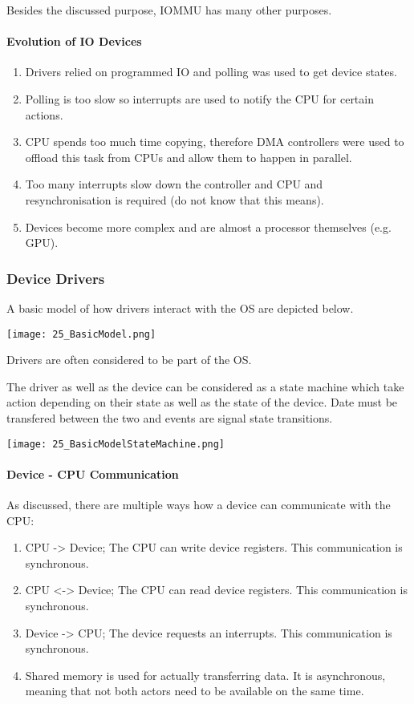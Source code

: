 Besides the discussed purpose, IOMMU has many other purposes.

\paragraph{Evolution of IO Devices}
\begin{enumerate}
    \item Drivers relied on programmed IO and polling was used to get device states.
    \item Polling is too slow so interrupts are used to notify the CPU for certain actions.
    \item CPU spends too much time copying, therefore DMA controllers were used to offload this task from CPUs and allow them to happen in parallel.
    \item Too many interrupts slow down the controller and CPU and resynchronisation is required (do not know that this means).
    \item Devices become more complex and are almost a processor themselves (e.g. GPU).
\end{enumerate}


\subsubsection{Device Drivers}
A basic model of how drivers interact with the OS are depicted below.

\texttt{[image: 25\_BasicModel.png]}

Drivers are often considered to be part of the OS.

The driver as well as the device can be considered as a state machine which take action depending on their state as well as the state of the device. Date must be transfered between the two and events are signal state transitions.

\texttt{[image: 25\_BasicModelStateMachine.png]}

\paragraph{Device - CPU Communication}
As discussed, there are multiple ways how a device can communicate with the CPU:

\begin{enumerate}
    \item CPU -> Device; The CPU can write device registers. This communication is synchronous.
    \item CPU <-> Device; The CPU can read device registers. This communication is synchronous.
    \item Device -> CPU; The device requests an interrupts. This communication is synchronous.
    \item Shared memory is used for actually transferring data. It is asynchronous, meaning that not both actors need to be available on the same time.
\end{enumerate}

